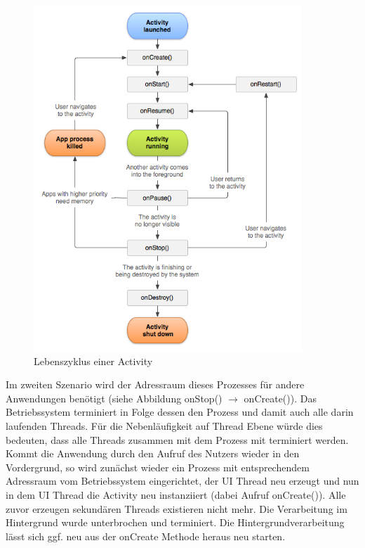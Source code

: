 \documentclass[12pt,oneside,a4paper,bibtotoc,liststotoc]{scrreprt}
\begin{document}
\begin{figure}[H]
  \begin{centering}
    \includegraphics[width=0.9\textwidth]{img/activity_lifecycle.png}
    \caption{Lebenszyklus einer Activity \cite[]{androidDevDocu}}
    \label{Activity_Lifecycle}
  \end{centering}
\end{figure}
Im zweiten Szenario wird der Adressraum dieses Prozesses für andere Anwendungen benötigt (siehe Abbildung onStop() $\rightarrow$  onCreate()). Das Betriebssystem terminiert in Folge dessen den Prozess und damit auch alle darin laufenden Threads. Für die Nebenläufigkeit auf Thread Ebene würde dies bedeuten, dass alle Threads zusammen mit dem Prozess mit terminiert werden. Kommt die Anwendung durch den Aufruf des Nutzers wieder in den Vordergrund, so wird zunächst wieder ein Prozess mit entsprechendem Adressraum vom Betriebssystem eingerichtet, der UI Thread neu erzeugt und nun in dem UI Thread die Activity neu instanziiert (dabei Aufruf onCreate()). Alle zuvor erzeugen sekundären Threads existieren nicht mehr. Die Verarbeitung im Hintergrund wurde unterbrochen und terminiert. Die Hintergrundverarbeitung lässt sich ggf. neu aus der onCreate Methode heraus neu starten.
\end{document}
